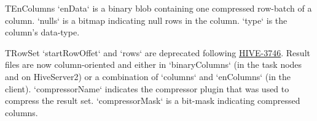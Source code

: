 \documentclass[11pt,a4paper]{article}
\begin{document}
		TEnColumns `enData` is a binary blob containing one compressed row-batch of a column.
		`nulls` is a bitmap indicating null rows in the column.
		`type` is the column's data-type.
		
		TRowSet `startRowOffet` and `rows` are deprecated following \href{https://issues.apache.org/jira/browse/HIVE-3746}{HIVE-3746}.
		Result files are now column-oriented and either in `binaryColumns` (in the task nodes and on HiveServer2) or a combination of `columns` and `enColumns` (in the client).
		`compressorName` indicates the compressor plugin that was used to compress the result set.
		`compressorMask` is a bit-mask indicating compressed columns.
		
\end{document}
